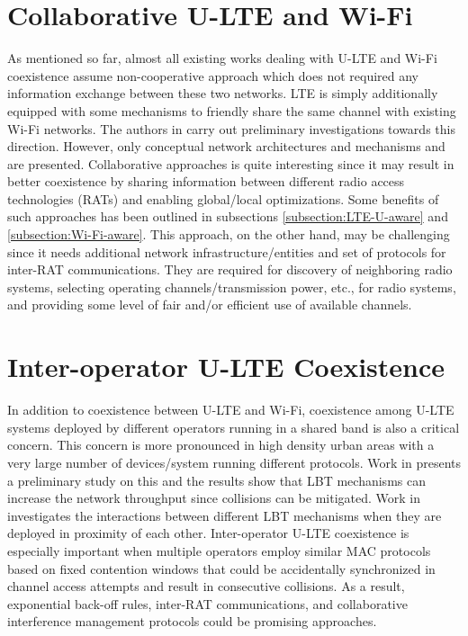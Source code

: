 \section{Collaborative U-LTE and Wi-Fi}
As mentioned so far, almost all existing works dealing with \mbox{U-LTE} and \mbox{Wi-Fi} coexistence assume non-cooperative approach which does not required any information exchange between these two networks. LTE is simply additionally equipped with some mechanisms to friendly share the same channel with existing \mbox{Wi-Fi} networks. The authors in \cite{U-LTE-5G-2015, Coordinated-LTE-U-Wi-Fi-2015} carry out preliminary investigations towards this direction. However, only conceptual network architectures and mechanisms and are presented. Collaborative approaches is quite interesting since it may result in better coexistence by sharing information between different radio access technologies (RATs) and enabling global/local optimizations. Some benefits of such approaches has been outlined in subsections \ref{subsection:LTE-U-aware} and \ref{subsection:Wi-Fi-aware}. This approach, on the other hand, may be challenging since it needs additional network infrastructure/entities and set of protocols for inter-RAT communications. They are required for discovery of neighboring radio systems, selecting operating channels/transmission power, etc., for radio systems, and providing some level of fair and/or efficient use of available channels. 

\section{Inter-operator U-LTE Coexistence}
In addition to coexistence between \mbox{U-LTE} and \mbox{Wi-Fi}, coexistence among \mbox{U-LTE} systems deployed by different operators running in a shared band is also a critical concern. This concern is more pronounced in high density urban areas with a very large number of devices/system running different protocols. Work in \cite{LTE-U-ICC-WS-2015} presents a preliminary study on this and the results show that LBT mechanisms can increase the network throughput since collisions can be mitigated. Work in \cite{Enhanced-LTE-U-thesis-2015} investigates the interactions between different LBT mechanisms when they are deployed in proximity of each other. Inter-operator \mbox{U-LTE} coexistence is especially important when multiple operators employ similar MAC protocols based on fixed contention windows that could be accidentally synchronized in channel access attempts and result in consecutive collisions. As a result, exponential back-off rules, inter-RAT communications, and collaborative interference management protocols could be promising approaches.

